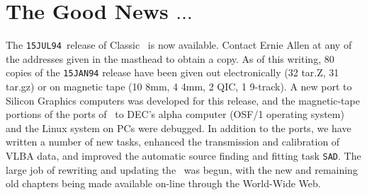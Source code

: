 

\newcommand{\AMark}{AIPSMark$^{(93)}$}
\newcommand{\AMarks}{AIPSMarks$^{(93)}$}
\newcommand{\LMark}{AIPSLoopMark$^{(93)}$}
\newcommand{\LMarks}{AIPSLoopMarks$^{(93)}$}
\newcommand{\AM}{A_m^{(93)}}
\newcommand{\ALM}{AL_m^{(93)}}

\newcommand{\AIPRELEASE}{July 15, 1994}
\newcommand{\AIPVOLUME}{Volume XIV}
\newcommand{\AIPNUMBER}{Number 2}
\newcommand{\RELEASENAME}{{\tt 15JUL94}}




\newcommand{\MYSpace}{-11pt}

\normalstyle

\section{The Good News $\ldots$}

The \RELEASENAME\ release of Classic \AIPS\ is now available.  Contact
Ernie Allen at any of the addresses given in the masthead to obtain a
copy.  As of this writing, 80 copies of the {\tt 15JAN94} release
have been given out electronically (32 tar.Z, 31 tar.gz) or on
magnetic tape (10 8mm, 4 4mm, 2 QIC, 1 9-track).    A new port to
Silicon Graphics computers was developed for this release, and the
magnetic-tape portions of the ports of \AIPS\ to DEC's alpha computer
(OSF/1 operating system) and the Linux system on PCs were debugged.
In addition to the ports, we have written a number of new tasks,
enhanced the transmission and calibration of VLBA data, and improved
the automatic source finding and fitting task \hbox{{\tt SAD}}.  The
large job of rewriting and updating the \Cookbook\ was begun, with the
new and remaining old chapters being made available on-line through
the World-Wide Web.

